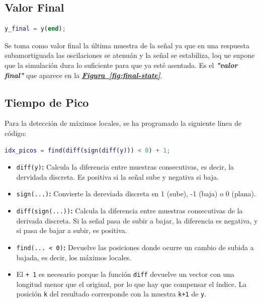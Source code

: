 \documentclass[12pt,a4paper]{article}
\newcommand{\figref}[1]{\hyperref[#1]{\textbf{\textit{\uline{Figura~\ref*{#1}}}}}}
\newcommand{\codigo}[1]{\colorbox{bgcmd}{\texttt{#1}}}
\begin{document}
\subsection{Valor Final}

\begin{lstlisting}[language=Matlab]
y_final = y(end);
\end{lstlisting}

Se toma como valor final la última muestra de la señal ya que en una respuesta subamortiguada las oscilaciones se atenuán y la señal se estabiliza, loq ue supone que la simulación dura lo suficiente para que ya esté asentada.
Es el \textbf{\textit{"valor final"}} que aparece en la \figref{fig:final-state}.

\subsection{Tiempo de Pico}

Para la detección de máximos locales, se ha programado la siguiente línea de código:

\begin{lstlisting}[language=Matlab]
idx_picos = find(diff(sign(diff(y))) < 0) + 1;
\end{lstlisting}

\begin{itemize}[label=$\bullet$]
  \item \codigo{diff(y)}\textbf{:} Calcula la diferencia entre muestras consecutivas, es decir, la dervidada discreta. Es positiva si la señal sube y negativa si baja.
  \item \codigo{sign(...)}\textbf{:} Convierte la dereviada discreta en 1 (sube), -1 (baja) o 0 (plana).
  \item \codigo{diff(sign(...))}\textbf{:} Calcula la diferencia entre muestras consecutivas de la derivada discreta. Si la señal pasa de subir a bajar, la diferencia es negativa, y si pasa de bajar a subir, es positiva.
  \item \codigo{find(... < 0)}\textbf{:} Devuelve las posiciones donde ocurre un cambio de subida a bajada, es decir, los máximos locales.
  \item El \codigo{+ 1} es necesario porque la función \codigo{diff} devuelve un vector con una longitud menor que el original, por lo que hay que compensar el índice. La posición \codigo{k} del resultado corresponde con la muestra \codigo{k+1} de \codigo{y}.
\end{itemize}
\end{document}
